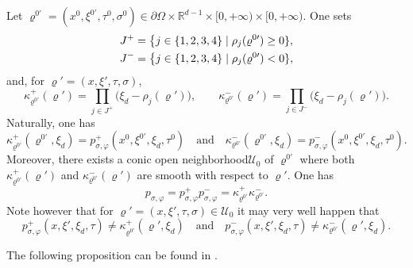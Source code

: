\documentclass[10pt]{amsart}
\newcommand{\quand}{\quad\text{and}\quad}
\let\sep\mid
\theoremstyle{plain}
\theoremstyle{definition}
\def\R{\mathbb{R}}
\newcommand{\nhd}{neighborhood\xspace}
\let\k\kappa
\let\y\varrho
\let \Im \relax
\DeclareMathOperator{\Im}{Im}
\newcommand{\U}{\mathscr U}
\newcommand{\pconj}{p_{\sigma,\varphi}}
\begin{document}
Let $\y^{0\prime} = (x^0, \xi^{0\prime}, \tau^0, \sigma^0)\in \partial
\Omega \times \R^{d-1}\times [0,+\infty) \times [0,+\infty)$.
One sets
\begin{align*}
&J^+= \big\{ j \in \{1,2,3,4\}\sep \Im \rho_j (\y^{0\prime}) \geq 0\}, \\
&J^-= \big\{ j \in \{1,2,3,4\}\sep \Im \rho_j (\y^{0\prime}) < 0\},
\end{align*}
and, for $\y' = (x,\xi', \tau,\sigma)$,
\begin{equation*}
\k^+_{\y^{0\prime}} (\y')
= \prod_{j \in J^+} \big(\xi_d -\rho_j(\y')\big),
\qquad
\k^-_{\y^{0\prime}} (\y')
= \prod_{j \in J^-} \big(\xi_d -\rho_j(\y')\big).
\end{equation*}
Naturally, one has
\[
\k^+_{\y^{0\prime}} (\y^{0\prime},\xi_d) = \pconj^+(x^0,
\xi^{0\prime}, \xi_d, \tau^0)\quand\k^-_{\y^{0\prime}} (\y^{0\prime},\xi_d) = \pconj^-(x^0,
\xi^{0\prime}, \xi_d, \tau^0).
\]
Moreover, there exists a conic open \nhd $\U_0$ of
$\y^{0\prime}$ where both $\k^+_{\y^{0\prime}}(\y')$ and
$\k^-_{\y^{0\prime}}(\y')$ are smooth with respect to $\y'$.
One has
\begin{equation*}
\pconj = \pconj^+ \pconj^-
= \k^+_{\y^{0\prime}} \k^-_{\y^{0\prime}} .
\end{equation*}
Note however that for $\y' = (x,\xi',\tau,\sigma) \in \U_0$ it may very well happen that
\[
\pconj^+(x,\xi', \xi_d, \tau) \neq \k^+_{\y^{0\prime}} (\y',\xi_d)\quand \pconj^-(x,\xi', \xi_d, \tau) \neq \k^-_{\y^{0\prime}} (\y',\xi_d).
\]

The following proposition can be found in \cite[Prop.\,1.8]{ML}.
\end{document}
